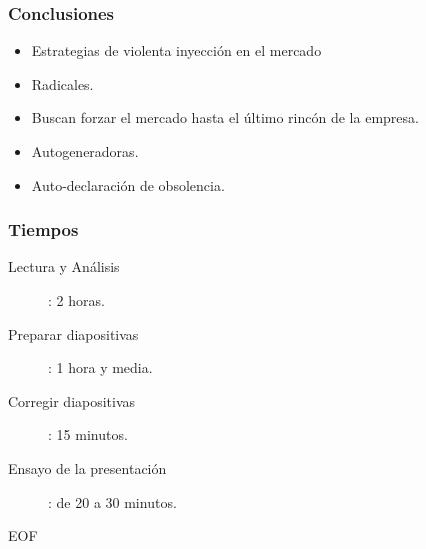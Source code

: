 \frame
{
\frametitle{Conclusiones}
\begin{itemize}
    \item{Estrategias de violenta inyección en el mercado}
    \item Radicales.
    \item Buscan forzar el mercado hasta el último rincón de la empresa.
    \item Autogeneradoras.
    \item Auto-declaración de obsolencia.
\end{itemize}
}

\frame
{
\frametitle{Tiempos}
\begin{description}
    \item[Lectura y Análisis]: 2 horas.
    \item[Preparar diapositivas]: 1 hora y media. 
    \item[Corregir diapositivas]: 15 minutos.
    \item[Ensayo de la presentación]: de 20 a 30 minutos.
\end{description}
}
\frame
{
	\vspace{2cm}
	\begin{center}
		\Large{EOF}
	\end{center}
}
